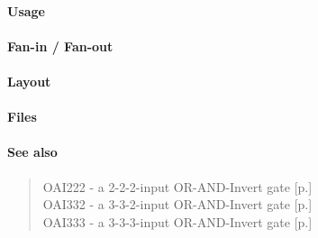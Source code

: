 \paragraph{Usage}

\paragraph{Fan-in / Fan-out}

\paragraph{Layout}

\paragraph{Files}

\paragraph{See also}
\begin{quote}
    OAI222 - a 2-2-2-input OR-AND-Invert gate [p.\pageref{OAI222}] \\
    OAI332 - a 3-3-2-input OR-AND-Invert gate [p.\pageref{OAI332}] \\
    OAI333 - a 3-3-3-input OR-AND-Invert gate [p.\pageref{OAI333}]
\end{quote}
